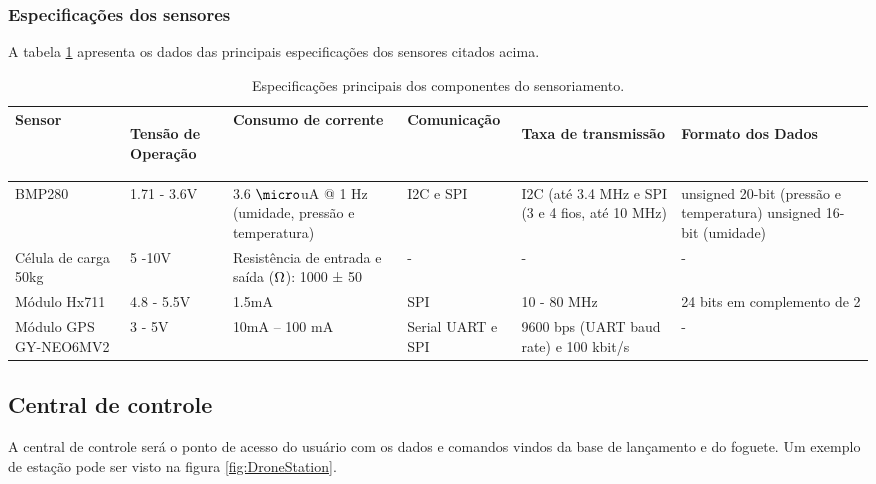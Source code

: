 \subsubsection{Especificações dos sensores}
A tabela \ref{tab:sensores} apresenta os dados das principais especificações dos sensores citados acima.

\begin{center}
\begin{table}[H]
\centering
\begin{tabular}{ |m{2cm}|m{2cm}|m{2.5cm}|m{2.5cm}|m{2.5cm}|m{2.5cm}| } 
\hline

\textbf{ Sensor }&\begin{center}
\textbf{ Tensão de Operação} \end{center}& \textbf{Consumo de corrente }& \textbf{Comunicação} & \begin{center}\textbf{Taxa de transmissão} \end{center} & \begin{center}\textbf{Formato dos Dados}\end{center}\\ 
 \hline
 
 BMP280 & 1.71 - 3.6V & 3.6 $\micro$uA @ 1 Hz (umidade, pressão e temperatura) & 
I2C e SPI & I2C (até 3.4 MHz e SPI (3 e 4 fios, até 10 MHz) & unsigned 20-bit (pressão e temperatura) unsigned 16-bit (umidade)\\
  \hline
Célula de carga 50kg & 5 -10V & Resistência de entrada e saída ($\ohm$): 1000 ± 50 & - & - & - \\
  \hline
 Módulo Hx711 & 4.8 - 5.5V & 1.5mA & SPI & 10 - 80 MHz & 24 bits em complemento de 2 \\ 
  \hline
 Módulo GPS GY-NEO6MV2 & 3 - 5V & 10mA – 100 mA & Serial UART e SPI & 9600 bps (UART baud rate) e 100 kbit/s & - \\ 
 \hline 

\end{tabular}
\caption{Especificações principais dos componentes do sensoriamento.}
\label{tab:sensores}
\end{table}
\end{center}

\newpage
\subsection{Central de controle}

A central de controle será o ponto de acesso do usuário com os dados e comandos vindos da base de lançamento e do foguete. Um exemplo de estação pode ser visto na figura \ref{fig:DroneStation}. 

